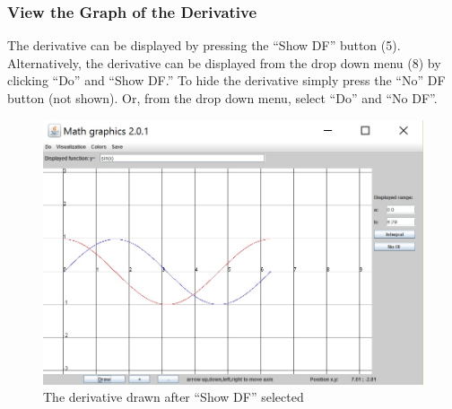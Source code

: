 \documentclass{article}[12 pt]
\begin{document}
		 	\subsubsection{View the Graph of the Derivative}
 			The derivative can be displayed by pressing the ``Show DF'' button (5). Alternatively, the derivative can be displayed from the drop down menu (8) by clicking ``Do'' and ``Show DF.'' To hide the derivative simply press the ``No'' DF button (not shown). Or, from the drop down menu, select ``Do'' and ``No DF''.
 				\begin{figure}[h!]
 					\centering
 					\includegraphics[scale = .85]{showDF}
					\caption{The derivative drawn after ``Show DF'' selected}
 				\end{figure}	
			
\end{document}
